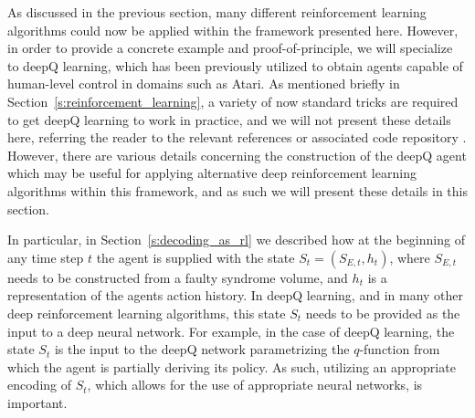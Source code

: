 \documentclass[twocolumn,preprintnumbers,amsmath,amssymb,notitlepage,nofootinbib,longbibliography,superscriptaddress,aps,pra,10pt]{revtex4-1}
\begin{document}
	As discussed in the previous section, many different reinforcement learning algorithms could now be applied within the framework presented here. 
	However, in order to provide a concrete example and proof-of-principle, we will specialize to deepQ learning, which has been previously utilized to obtain agents capable of human-level control in domains such as Atari.
	As mentioned briefly in Section~\ref{s:reinforcement_learning}, a variety of now standard tricks are required to get deepQ learning to work in practice, and we will not present these details here, referring the reader to the relevant references \cite{RLMnih15,RLvan2016deep,RLschaul2015prioritized,RLwang2015dueling} or associated code repository \cite{DeepQDecoding}.
	However, there are various details concerning the construction of the deepQ agent which may be useful for applying alternative deep reinforcement learning algorithms within this framework, and as such we will present these details in this section.

	In particular, in Section~\ref{s:decoding_as_rl} we described how at the beginning of any time step $t$ the agent is supplied with the state $S_{t}=(S_{E,{t}},h_{t})$, where $S_{E,{t}}$ needs to be constructed from a faulty syndrome volume, and $h_{t}$ is a representation of the agents action history.
	In deepQ learning, and in many other deep reinforcement learning algorithms, this state $S_t$ needs to be provided as the input to a deep neural network.
	For example, in the case of deepQ learning, the state $S_t$ is the input to the deepQ network parametrizing the $q$-function from which the agent is partially deriving its policy.
	As such, utilizing an appropriate encoding of $S_t$, which allows for the use of appropriate neural networks, is important.
\end{document}
